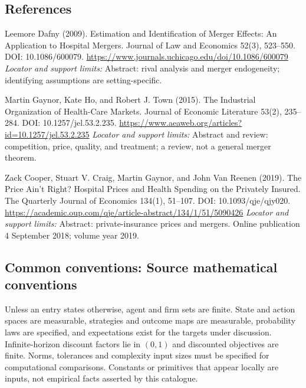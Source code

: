 \documentclass[11pt,a4paper]{article}
\begin{document}
\subsection*{References}
\begin{enumerate}[label={[S\arabic*]},leftmargin=*,itemsep=0.6em]
\item Leemore Dafny (2009). Estimation and Identification of Merger Effects: An Application to Hospital Mergers. Journal of Law and Economics 52(3), 523--550. DOI: 10.1086/600079.
\url{https://www.journals.uchicago.edu/doi/10.1086/600079}
\newline\emph{Locator and support limits:} Abstract: rival analysis and merger endogeneity; identifying assumptions are setting-specific.
\item Martin Gaynor, Kate Ho, and Robert J. Town (2015). The Industrial Organization of Health-Care Markets. Journal of Economic Literature 53(2), 235--284. DOI: 10.1257/jel.53.2.235.
\url{https://www.aeaweb.org/articles?id=10.1257/jel.53.2.235}
\newline\emph{Locator and support limits:} Abstract and review: competition, price, quality, and treatment; a review, not a general merger theorem.
\item Zack Cooper, Stuart V. Craig, Martin Gaynor, and John Van Reenen (2019). The Price Ain’t Right? Hospital Prices and Health Spending on the Privately Insured. The Quarterly Journal of Economics 134(1), 51--107. DOI: 10.1093/qje/qjy020.
\url{https://academic.oup.com/qje/article-abstract/134/1/51/5090426}
\newline\emph{Locator and support limits:} Abstract: private-insurance prices and mergers. Online publication 4 September 2018; volume year 2019.
\end{enumerate}

\subsection*{Common conventions: Source mathematical conventions}

Unless an entry states otherwise, agent and firm sets are finite. State and action spaces are measurable, strategies and outcome maps are measurable, probability laws are specified, and expectations exist for the targets under discussion. Infinite-horizon discount factors lie in $(0,1)$ and discounted objectives are finite. Norms, tolerances and complexity input sizes must be specified for computational comparisons. Constants or primitives that appear locally are inputs, not empirical facts asserted by this catalogue.
\end{document}
